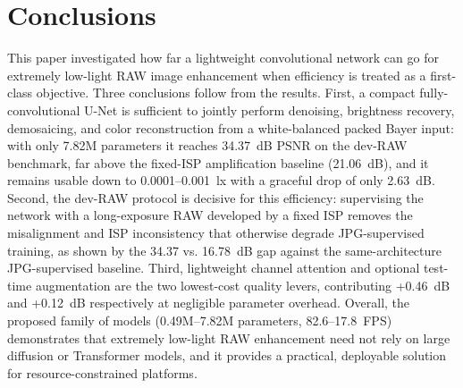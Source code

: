 \documentclass[remotesensing,article,accept,moreauthors]{Definitions/mdpi}
\begin{document}
\section{Conclusions}
\label{sec:conclusion}

This paper investigated how far a lightweight convolutional network can go for extremely low-light RAW image enhancement when efficiency is treated as a first-class objective. Three conclusions follow from the results. First, a compact fully-convolutional U-Net is sufficient to jointly perform denoising, brightness recovery, demosaicing, and color reconstruction from a white-balanced packed Bayer input: with only 7.82M parameters it reaches 34.37~dB PSNR on the dev-RAW benchmark, far above the fixed-ISP amplification baseline (21.06~dB), and it remains usable down to 0.0001--0.001~lx with a graceful drop of only 2.63~dB. Second, the dev-RAW protocol is decisive for this efficiency: supervising the network with a long-exposure RAW developed by a fixed ISP removes the misalignment and ISP inconsistency that otherwise degrade JPG-supervised training, as shown by the 34.37 vs. 16.78~dB gap against the same-architecture JPG-supervised baseline. Third, lightweight channel attention and optional test-time augmentation are the two lowest-cost quality levers, contributing +0.46~dB and +0.12~dB respectively at negligible parameter overhead. Overall, the proposed family of models (0.49M--7.82M parameters, 82.6--17.8~FPS) demonstrates that extremely low-light RAW enhancement need not rely on large diffusion or Transformer models, and it provides a practical, deployable solution for resource-constrained platforms.





\end{document}

